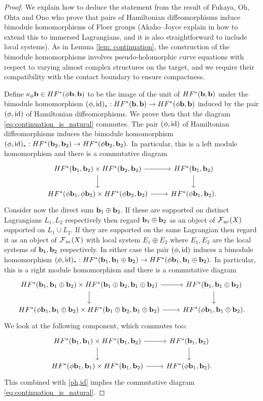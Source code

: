\documentclass{article}
\theoremstyle{plain}%
\theoremstyle{definition}
\numberwithin{equation}{section}
\numberwithin{figure}{section}
\def\eq{\eqref}
\def\l{\label}
\def\id{{\rm id}}
\def\cF{{\mathbin{\cal F}}}
\def\ka{\kappa}
\def\ph{\phi}
\def\op{\oplus}
\begin{document}
\begin{proof}
We explain how to deduce the statement from the result of Fukaya, Oh, Ohta and Ono \cite[Theorem G (G.4)]{FOOO} who prove that pairs of Hamiltonian diffeomorphisms induce bimodule homomorphisms of Floer groups (Akaho--Joyce explain in \cite[Theorem 13.6]{AJ} how to extend this to immersed Lagrangians, and it is also straightforward to include local systems). As in Lemma \ref{lem: continuation}, the construction of the bimodule homomorphisms involves pseudo-holomorphic curve equations with respect to varying almost complex structures on the target, and we require their compatibility with the contact boundary to ensure compactness.

Define $\ka_\ph \b\in HF^*(\ph \b,\b)$ to be the image of the unit of $HF^*({\mathbf{b}},{\mathbf{b}})$ under the bimodule homomorphism $(\ph,\id)_*:HF^*(\b,\b)\to HF^*(\ph\b,\b)$ induced by the pair $(\ph,\id)$ of Hamiltonian diffeomorphisms.
We prove then that the diagram \eq{eq:continuation_is_natural} commutes.
The pair $(\ph,\id)$ of Hamiltonian diffeomorphisms induces the bimodule homomorphism $(\ph,\id)_*:HF^*(\b_2,\b_2)\to HF^*(\ph\b_2,\b_2).$ In particular, this is a left module homomorphism and there is a commutative diagram
\begin{equation}\l{ph,id}
\begin{tikzcd}
HF^*(\b_1,\b_2)\times HF^*(\b_2,\b_2)\ar[d]\ar[r]& HF^*(\b_1,\b_2)\ar[d]\\
HF^*(\ph \b_1,\ph \b_2)\times HF^*(\ph \b_2,\b_2)\ar[r]& HF^*(\ph\b_1,\b_2).
\end{tikzcd}
\end{equation}
Consider now the direct sum $\b_1\op\b_2.$ If these are supported on distinct Lagrangians $L_1,L_2$ respectively then regard $\b_1\op\b_2$ as an object of $\cF_\nc(X)$ supported on $L_1\cup L_2.$ If they are supported on the same Lagrangian then regard it as an object of $\cF_\nc(X)$ with local system $E_1\op E_2$ where $E_1,E_2$ are the local systems of ${\mathbf{b}}_1,{\mathbf{b}}_2$ respectively.
In either case the pair $(\ph,\id)$ induces a bimodule homomorphism $(\ph,\id)_*:HF^*(\b_1,\b_1\op\b_2)\to HF^*(\ph \b_1,\b_1\op \b_2).$ In particular, this is a right module homomorphism and there is a commutative diagram
\[
\begin{tikzcd}
HF^*( \b_1,\b_1\op\b_2)\times HF^*(\b_1\op\b_2,\b_1\op\b_2)\ar[d]\ar[r]& HF^*(\b_1,\b_1\op\b_2)\ar[d]\\
HF^*(\ph \b_1,\b_1\op \b_2)\times HF^*(\b_1\op \b_2,\b_1\op\b_2)\ar[r]& HF^*(\ph\b_1,\b_1\op\b_2).
\end{tikzcd}
\]
We look at the following component, which commutes too:
\begin{equation}\l{ph,id2}
\begin{tikzcd}
HF^*( \b_1,\b_1)\times HF^*(\b_1,\b_2)\ar[d]\ar[r]& HF^*(\b_1,\b_2)\ar[d]\\
HF^*(\ph \b_1,\b_1)\times HF^*(\b_1,\b_2)\ar[r]& HF^*(\ph\b_1,\b_2).
\end{tikzcd}
\end{equation}
This combined with \eq{ph,id} implies the commutative diagram \eq{eq:continuation_is_natural}.


\end{proof}
\end{document}
